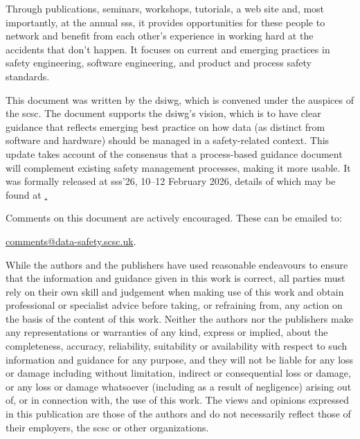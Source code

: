 Through publications, seminars, workshops, tutorials, a web site and, most importantly, at the annual \gls{sss}, it provides opportunities for these people to network and benefit from each other’s experience in working hard at the accidents that don’t happen. It focuses on current and emerging practices in safety engineering, software engineering, and product and process safety standards.

This document was written by the \gls{dsiwg}, which is convened under the auspices of the \gls{scsc}. The document supports the \gls{dsiwg}'s vision, which is to have clear guidance that reflects emerging best practice on how data (as distinct from software and hardware) should be managed in a safety-related context. This update takes account of the consensus that a process-based guidance document will complement existing safety management processes, making it more usable. It was formally released at
\gls{sss}'26, 10--12 February 2026,
details of which may be found at
\href{https://scsc.uk/sss}.

Comments on this document are actively encouraged. These can be emailed to: 
\begin{center}
	\href{mailto:comments@data-safety.scsc.uk}{comments@data-safety.scsc.uk}.
\end{center}

While the authors and the publishers have used reasonable endeavours to ensure that the information and guidance given in this work is correct, all parties must rely on their own skill and judgement when making use of this work and obtain professional or specialist advice before taking, or refraining from, any action on the basis of the content of this work. Neither the authors nor the publishers make any representations or warranties of any kind, express or implied, about the completeness, accuracy, reliability, suitability or availability with respect to such information and guidance for any purpose, and they will not be liable for any loss or damage including without limitation, indirect or consequential loss or damage, or any loss or damage whatsoever (including as a result of negligence) arising out of, or in connection with, the use of this work. The views and opinions expressed in this publication are those of the authors and do not necessarily reflect those of their employers, the \gls{scsc} or other organizations.

\thispagestyle{empty}%
\clearpage
\maketitle
\thispagestyle{empty}%


